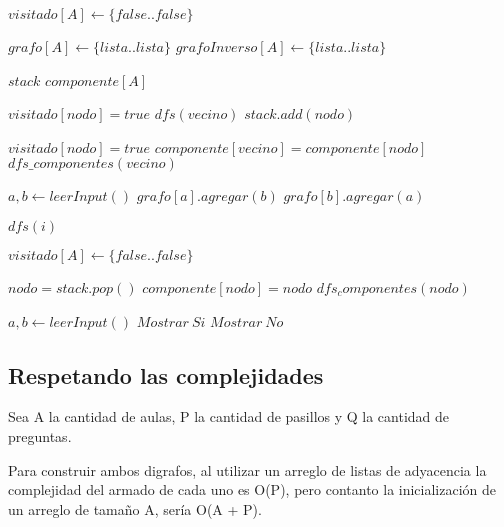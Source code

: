 \begin{algorithmic}

\State $visitado[A] \gets \{false..false\}$

\State $grafo[A] \gets \{lista..lista\}$
\State $grafoInverso[A] \gets \{lista..lista\}$

\State $stack$
\State $componente[A]$

	\State $visitado[nodo] = true$
			\State $dfs(vecino)$
		\EndIf
	\EndFor
	\State $stack.add(nodo)$
\EndFunction

	\State $visitado[nodo] = true$
			\State $componente[vecino] = componente[nodo]$
			\State $dfs\_componentes(vecino)$
		\EndIf
	\EndFor
\EndFunction


    	\State $a, b \gets leerInput()$
    	\State $grafo[a].agregar(b)$
    	\State $grafo[b].agregar(a)$
    \EndFor

    		\State $dfs(i)$
    	\EndIf
    \EndFor

    \State $visitado[A] \gets \{false..false\}$

    	\State $nodo = stack.pop()$
    		\State $componente[nodo] = nodo$
    		\State $dfs_componentes(nodo)$
    	\EndIf
    \EndWhile

    	\State $a, b \gets leerInput()$
    		\State $Mostrar\ Si$
    	\EndIf
    		\State $Mostrar\ No$
    	\EndIf   	
    \EndFor

\EndFunction

\end{algorithmic}


\subsection{Respetando las complejidades}

Sea A la cantidad de aulas, P la cantidad de pasillos y Q la cantidad de preguntas.\newline

Para construir ambos digrafos, al utilizar un arreglo de listas de adyacencia la complejidad del armado de cada uno es O(P), pero contanto la inicialización de un arreglo de tamaño A, sería O(A + P).\newline

